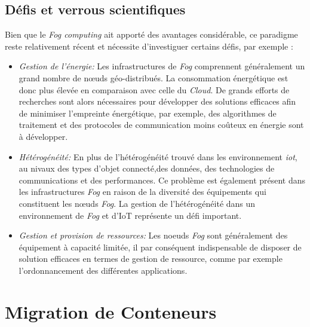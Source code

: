 \subsection{Défis et verrous scientifiques}
Bien que le \emph{Fog computing} ait apporté des avantages considérable, ce paradigme reste relativement récent et nécessite  d'investiguer certains défis, par exemple :
\begin{itemize}
  \item \emph{Gestion de l'énergie:} Les infrastructures de \emph{Fog} comprennent généralement un grand nombre de nœuds géo-distribués. La consommation énergétique est donc plus élevée en comparaison avec celle du \emph{Cloud}. De grands efforts de recherches sont alors nécessaires pour développer des solutions efficaces afin de minimiser l'empreinte énergétique, par exemple, des algorithmes de traitement et des protocoles de communication moins coûteux en énergie sont à développer.
  \item \emph{Hétérogénéité:} En plus de l'hétérogénéité trouvé dans les environnement \emph{iot}, au nivaux des types d'objet connecté,des données, des technologies de communications et des performances. Ce problème est également présent dans les infrastructures \emph{Fog} en raison de la diversité des équipements qui constituent les nœuds \emph{Fog}. La gestion de l'hétérogénéité dans un environnement de \emph{Fog} et d'IoT représente  un défi important.
  \item \emph{Gestion et provision de ressources:} Les noeuds \emph{Fog} sont généralement des équipement à capacité limitée, il par conséquent indispensable de disposer de solution efficaces en termes de gestion de ressource, comme par exemple l'ordonnancement des différentes applications.
\end{itemize}
\section{Migration de Conteneurs}

